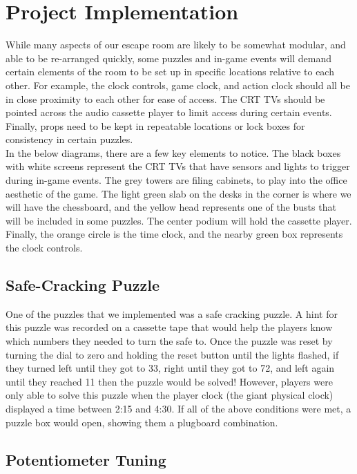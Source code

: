 \documentclass[conference]{IEEEtran}
\begin{document}
\section{Project Implementation}
While many aspects of our escape room are likely to be somewhat modular, and able to be re-arranged quickly,
some puzzles and in-game events will demand certain elements of the room to be set up in specific locations relative
to each other. For example, the clock controls, game clock, and action clock should all be in close proximity to each
other for ease of access. The CRT TVs should be pointed across the audio cassette player to limit
access during certain events. Finally, props need to be kept in repeatable
locations or lock boxes for consistency in certain puzzles.
\\
\indent In the below diagrams, there are a few key elements to notice. The black boxes with white screens
represent the CRT TVs that have sensors and lights to trigger during in-game events. The
grey towers are filing cabinets, to play into the office aesthetic of the game. The light green slab on the
desks in the corner is where we will have the chessboard, and the yellow head represents one of the busts
that will be included in some puzzles. The center podium will hold the cassette player. Finally, the orange circle
is the time clock, and the nearby green box represents the clock controls.

\subsection{Safe-Cracking Puzzle} %
One of the puzzles that we implemented was a safe cracking puzzle. A hint for this puzzle was recorded on a cassette tape
that would help the players know which numbers they needed to turn the safe to. Once the puzzle was reset by turning the dial
to zero and holding the reset button until the lights flashed, if they turned left until they got to 33, right until they got to 72,
and left again until they reached 11 then the puzzle would be solved! However, players were only able to solve this puzzle when the
player clock (the giant physical clock) displayed a time between 2:15 and 4:30. If all of the above conditions were met, a puzzle box
would open, showing them a plugboard combination.

\subsection{Potentiometer Tuning}
\end{document}
